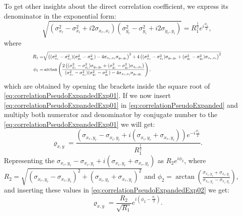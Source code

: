 \documentclass[
]{book}
\begin{document}
To get other insights about the direct correlation coefficient, we express its denominator in the exponential form:
\begin{equation}
    {\sqrt{(\sigma_{x_r}^2 - \sigma_{x_i}^2 + i2 \sigma_{x_r,x_i})(\sigma_{y_r}^2 - \sigma_{y_i}^2 + i2 \sigma_{y_r,y_i})}} = R_1^{\frac{1}{2}} e^{i \frac{\phi_1}{2}},
    \label{eq:correlationPseudoExpandedExp01}
\end{equation}
where
\begin{equation}
    \resizebox{0.8\textwidth}{!}{$
    \begin{aligned}
        R_1 = & \sqrt{\left((\sigma_{x_r}^2 - \sigma_{x_i}^2)(\sigma_{y_r}^2 - \sigma_{y_i}^2) - 4 \sigma_{x_r,x_i} \sigma_{y_r,y_i} \right)^2+ 4 \left( (\sigma_{x_r}^2 - \sigma_{x_i}^2) \sigma_{y_r,y_i} + (\sigma_{y_r}^2 - \sigma_{y_i}^2) \sigma_{x_r,x_i} \right)^2} \\
        \phi_1 = &\arctan \left(\frac{2 \left( (\sigma_{x_r}^2 - \sigma_{x_i}^2) \sigma_{y_r,y_i} + (\sigma_{y_r}^2 - \sigma_{y_i}^2) \sigma_{x_r,x_i} \right)}{(\sigma_{x_r}^2 - \sigma_{x_i}^2)(\sigma_{y_r}^2 - \sigma_{y_i}^2) - 4 \sigma_{x_r,x_i} \sigma_{y_r,y_i}}\right) ,
    \end{aligned} $}
    \label{eq:correlationPseudoExpandedExpRPhi}
\end{equation}
which are obtained by opening the brackets inside the square root of \eqref{eq:correlationPseudoExpandedExp01}. If we now insert \eqref{eq:correlationPseudoExpandedExp01} in \eqref{eq:correlationPseudoExpanded} and multiply both numerator and denominator by conjugate number to the \eqref{eq:correlationPseudoExpandedExp01} we will get:
\begin{equation}
    {\varrho}_{x,y} = \frac{\left(\sigma_{x_r, y_r} - \sigma_{x_i, y_i} + i (\sigma_{x_i, y_r} + \sigma_{x_r, y_i})\right)e^{-i \frac{\phi_1}{2}}}{R_1^{\frac{1}{2}}}.
    \label{eq:correlationPseudoExpandedExp02}
\end{equation}
Representing the \(\sigma_{x_r, y_r} - \sigma_{x_i, y_i} + i (\sigma_{x_i, y_r} + \sigma_{x_r, y_i})\) as \(R_2 e^{i \phi_2}\), where \(R_2= \sqrt{(\sigma_{x_r, y_r} - \sigma_{x_i, y_i})^2 + (\sigma_{x_i, y_r} + \sigma_{x_r, y_i})^2}\) and \(\phi_2= \arctan \left( \frac{\sigma_{x_i, y_r} + \sigma_{x_r, y_i}}{\sigma_{x_r, y_r} - \sigma_{x_i, y_i}} \right)\), and inserting these values in \eqref{eq:correlationPseudoExpandedExp02} we get:
\begin{equation}
    {\varrho}_{x,y} = \frac{R_2}{\sqrt{R_1}} e^{i \left(\phi_2 - \frac{\phi_1}{2} \right)}.
    \label{eq:correlationPseudoExpandedExp03}
\end{equation}
\end{document}
